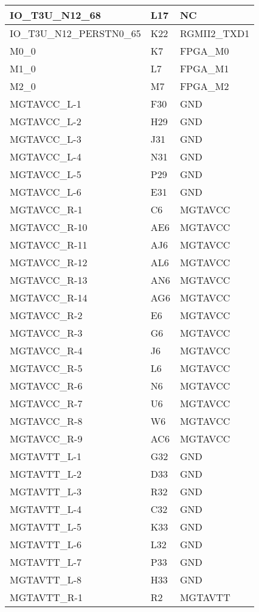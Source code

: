 \begin{footnotesize}
\begin{longtable}{|p{7cm}|p{1cm}|p{5cm}|}
IO\_T3U\_N12\_68	&	L17	&	NC	\\ \hline
IO\_T3U\_N12\_PERSTN0\_65	&	K22	&	RGMII2\_TXD1	\\ \hline
M0\_0	&	K7	&	FPGA\_M0	\\ \hline
M1\_0	&	L7	&	FPGA\_M1	\\ \hline
M2\_0	&	M7	&	FPGA\_M2	\\ \hline
MGTAVCC\_L-1	&	F30	&	GND	\\ \hline
MGTAVCC\_L-2	&	H29	&	GND	\\ \hline
MGTAVCC\_L-3	&	J31	&	GND	\\ \hline
MGTAVCC\_L-4	&	N31	&	GND	\\ \hline
MGTAVCC\_L-5	&	P29	&	GND	\\ \hline
MGTAVCC\_L-6	&	E31	&	GND	\\ \hline
MGTAVCC\_R-1	&	C6	&	MGTAVCC	\\ \hline
MGTAVCC\_R-10	&	AE6	&	MGTAVCC	\\ \hline
MGTAVCC\_R-11	&	AJ6	&	MGTAVCC	\\ \hline
MGTAVCC\_R-12	&	AL6	&	MGTAVCC	\\ \hline
MGTAVCC\_R-13	&	AN6	&	MGTAVCC	\\ \hline
MGTAVCC\_R-14	&	AG6	&	MGTAVCC	\\ \hline
MGTAVCC\_R-2	&	E6	&	MGTAVCC	\\ \hline
MGTAVCC\_R-3	&	G6	&	MGTAVCC	\\ \hline
MGTAVCC\_R-4	&	J6	&	MGTAVCC	\\ \hline
MGTAVCC\_R-5	&	L6	&	MGTAVCC	\\ \hline
MGTAVCC\_R-6	&	N6	&	MGTAVCC	\\ \hline
MGTAVCC\_R-7	&	U6	&	MGTAVCC	\\ \hline
MGTAVCC\_R-8	&	W6	&	MGTAVCC	\\ \hline
MGTAVCC\_R-9	&	AC6	&	MGTAVCC	\\ \hline
MGTAVTT\_L-1	&	G32	&	GND	\\ \hline
MGTAVTT\_L-2	&	D33	&	GND	\\ \hline
MGTAVTT\_L-3	&	R32	&	GND	\\ \hline
MGTAVTT\_L-4	&	C32	&	GND	\\ \hline
MGTAVTT\_L-5	&	K33	&	GND	\\ \hline
MGTAVTT\_L-6	&	L32	&	GND	\\ \hline
MGTAVTT\_L-7	&	P33	&	GND	\\ \hline
MGTAVTT\_L-8	&	H33	&	GND	\\ \hline
MGTAVTT\_R-1	&	R2	&	MGTAVTT	\\ \hline

\end{longtable}
\end{footnotesize}
